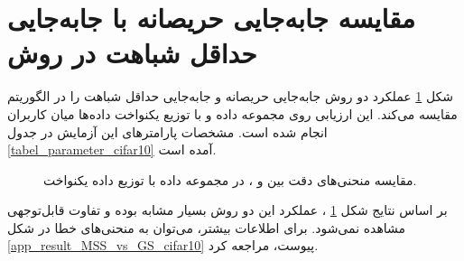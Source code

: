 \section{
	مقایسه جابه‌جایی حریصانه با جابه‌جایی حداقل شباهت در روش
}

شکل
\ref{result_MSS_vs_GS_cifar10}
عملکرد دو روش جابه‌جایی حریصانه و جابه‌جایی حداقل شباهت را در الگوریتم
مقایسه می‌کند. این ارزیابی روی مجموعه داده
و با توزیع یکنواخت داده‌ها میان کاربران انجام شده است. مشخصات پارامترهای این آزمایش در جدول
\ref{tabel_parameter_cifar10}
آمده است.


\begin{figure}[h]
	\centering
	\hspace{0.8mm}
	\caption{
		مقایسه منحنی‌های دقت بین
		و
		، در مجموعه داده
		با توزیع داده یکنواخت.
	}
	\label{result_MSS_vs_GS_cifar10}
\end{figure}


بر اساس نتایج شکل
\ref{result_MSS_vs_GS_cifar10}%
، عملکرد این دو روش بسیار مشابه بوده و تفاوت قابل‌توجهی مشاهده نمی‌شود. برای اطلاعات بیشتر، می‌توان به منحنی‌های خطا در شکل
\ref{app_result_MSS_vs_GS_cifar10}
پیوست، مراجعه کرد.


